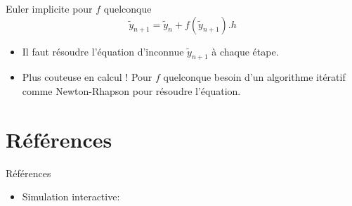 \documentclass{beamer}
\begin{document}
\begin{frame}{Euler implicite pour $f$ quelconque }
    \[ \widetilde{y}_{n+1} = \widetilde{y}_n + f(\widetilde{y}_{n+1}).h \]
    \begin{itemize}
        \item Il faut résoudre l'équation d'inconnue $\widetilde{y}_{n+1}$ à chaque étape.
        \item Plus couteuse en calcul ! Pour $f$ quelconque besoin d'un algorithme itératif comme Newton-Rhapson pour résoudre l'équation.
    \end{itemize}
\end{frame}
\section{Références}

\begin{frame}{Références}
    \begin{itemize}
        \item Simulation interactive: 
    \end{itemize}
\end{frame}
\end{document}
